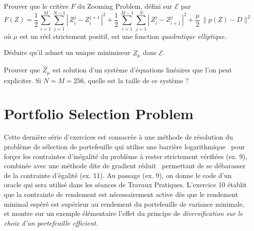 \documentclass[12pt,a4paper,fleqn]{report}
\newcommand{\on}{\begin{displaymath}}
\newcommand{\off}{\end{displaymath}}
\begin{document}
\begin{exercice}
\rien
\begin{questions}
\item Prouver que le crit\`ere $F$ du \og Zooming Problem\fg, d\'efini sur $\mathcal E$ par
\on F(Z)= \frac{1}{2}\, \sum_{i=1}^M \sum_{j=1}^{N-1} \left| \, Z_i^j -Z_i^{j+1}\,\right|^2 +
\frac{1}{2}\,\sum_{i=1}^{M-1} \sum_{j=1}^N \left| \, Z_i^j -Z_{i+1}^j \,\right|^2 + \frac{\mu}{2}\,\| p(Z)-D\|^2 \off
o\`u $\mu$ est un r\'eel strictement positif, est une fonction \it quadratique elliptique\rm. 
\item D\'eduire qu'il admet un unique minimiseur $\hat Z_\mu$ dans $\mathcal E$.
\item Prouver que $\hat Z_\mu$ est solution d'un syst\`eme d'\'equations lin\'eaires que l'on peut expliciter. Si $N=M=256$, quelle est la taille de ce syst\`eme ?
\end{questions}
\end{exercice}


\section{Portfolio Selection Problem}

Cette derni\`ere s\'erie d'exercices est consacr\'ee \`a une m\'ethode de r\'esolution du probl\`eme de s\'election de portefeuille qui utilise une \og barri\`ere logarithmique \fg\ pour forçer les contraintes d'in\'egalit\'e du probl\`eme \`a rester strictement v\'erifi\'ees (ex. 9), combin\'ee avec une m\'ethode dite de \og gradient r\'eduit \fg\ permettant de se d\'ebarasser de la contrainte d'\'egalit\'e (ex. 11). Au passage (ex. 9), on donne le code d'un oracle qui sera utilis\'e dans les s\'eances de Travaux Pratiques. L'exercice 10 \'etablit que la contrainte de rendement est n\'ecessairement active d\`es que le rendement minimal esp\'er\'e est sup\'erieur au rendement du portefeuille de variance minimale, et montre sur un exemple \'el\'ementaire l'effet du principe de \it diversification \rm sur le choix d'un portefeuille efficient.
\end{document}
